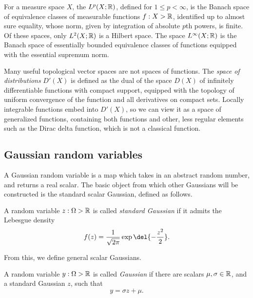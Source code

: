 \documentclass[11pt]{book}
\begin{document}
For a measure space $X$, the  $L^p(X;\mathbb{R})$, defined for $1 \leq p < \infty$, is the Banach space of equivalence classes of measurable functions $f : X \-> \mathbb{R}$, identified up to almost sure equality, whose norm, given by integration of absolute $p$th powers, is finite.
Of these spaces, only $L^2(X;\mathbb{R})$ is a Hilbert space.
The space $L^\infty(X;\mathbb{R})$ is the Banach space of essentially bounded equivalence classes of functions equipped with the essential supremum norm.

Many useful topological vector spaces are not spaces of functions.
The \emph{space of distributions} $D'(X)$ is defined as the dual of the space $D(X)$ of infinitely differentiable functions with compact support, equipped with the topology of uniform convergence of the function and all derivatives on compact sets.
Locally integrable functions embed into $D'(X)$, so we can view it as a space of generalized functions, containing both functions and other, less regular elements such as the Dirac delta function, which is not a classical function.


\subsection{Gaussian random variables}

A Gaussian random variable is a map which takes in an abstract random number, and returns a real scalar.
The basic object from which other Gaussians will be constructed is the standard scalar Gaussian, defined as follows.

\begin{definition}
A random variable $z : \Omega\->\mathbb{R}$ is called \emph{standard Gaussian} if it admits the Lebesgue density
\[
f(z) = \frac{1}{\sqrt{2\pi}} \exp\del{-\frac{z^2}{2}}
.
\]
\end{definition}

From this, we define general scalar Gaussians.

\begin{definition}
A random variable $y : \Omega\->\mathbb{R}$ is called \emph{Gaussian} if there are scalars $\mu, \sigma\in\mathbb{R}$, and a standard Gaussian $z$, such that
\[
y = \sigma z + \mu
.
\]
\end{definition}
\end{document}
